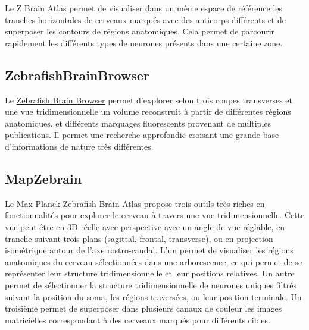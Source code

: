 Le \href{https://engertlab.fas.harvard.edu/Z-Brain/home/}{Z Brain Atlas} \cite{randlett_whole-brain_2015} permet de visualiser dans un même espace de référence les tranches horizontales de cerveaux marqués avec des anticorps différents et de superposer les contours de régions anatomiques. Cela permet de parcourir rapidement les différents types de neurones présents dans une certaine zone.

\subsection{ZebrafishBrainBrowser}

Le \href{http://zbbrowser.com}{Zebrafish Brain Browser} \cite{tabor_brain-wide_2019} permet d'explorer selon trois coupes transverses et une vue tridimensionnelle un volume reconstruit à partir de différentes régions anatomiques, et différents marquages fluorescents provenant de multiples publications. Il permet une recherche approfondie croisant une grande base d'informations de nature très différentes.

\subsection{MapZebrain}

Le \href{https://fishatlas.neuro.mpg.de/}{Max Planck Zebrafish Brain Atlas} \cite{kunst_cellular-resolution_2019} propose trois outils très riches en fonctionnalités pour explorer le cerveau à travers une vue tridimensionnelle. Cette vue peut être en 3D réelle avec perspective avec un angle de vue réglable, en tranche suivant trois plans (sagittal, frontal, transverse), ou en projection isométrique autour de l'axe rostro-caudal.
L'un permet de visualiser les régions anatomiques du cerveau sélectionnées dans une arborescence, ce qui permet de se représenter leur structure tridimensionnelle et leur positions relatives.
Un autre permet de sélectionner la structure tridimensionnelle de neurones uniques filtrés suivant la position du soma, les régions traversées, ou leur position terminale. Un troisième permet de superposer dans plusieurs canaux de couleur les images matricielles correspondant à des cerveaux marqués pour différents cibles.



